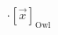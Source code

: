 \documentclass[preview]{standalone}
\begin{document}
\begin{align*}
\cdot [\vec{x}]_{\text{Owl}}
\end{align*}
\end{document}
